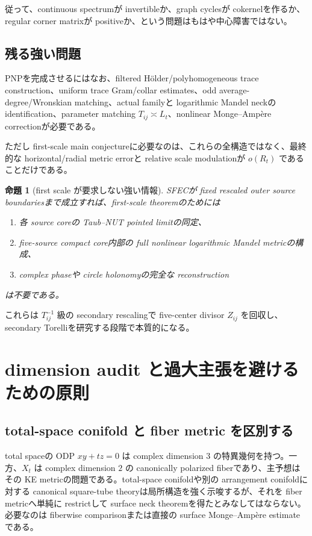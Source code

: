\documentclass[11pt,a4paper]{ltjsarticle}
\theoremstyle{plain}
\newtheorem{proposition}[conjecture]{命題}
\theoremstyle{definition}
\theoremstyle{remark}
\begin{document}
従って、continuous spectrumが invertibleか、graph cyclesが cokernelを作るか、regular corner matrixが positiveか、という問題はもはや中心障害ではない。

\subsection{残る強い問題}
PNPを完成させるにはなお、filtered Hölder/polyhomogeneous trace construction、uniform trace Gram/collar estimates、odd average-degree/Wronskian matching、actual familyと logarithmic Mandel neckの identification、parameter matching $T_{ij}\asymp L_t$、nonlinear Monge--Ampère correctionが必要である。

ただし first-scale main conjectureに必要なのは、これらの全構造ではなく、最終的な horizontal/radial metric errorと relative scale modulationが $o(R_t)$ であることだけである。

\begin{proposition}[first scale が要求しない強い情報]\label{prop:not-needed-v21}
SFECが fixed rescaled outer source boundariesまで成立すれば、first-scale theoremのためには
\begin{enumerate}[label=(\roman*)]
\item 各 source coreの Taub--NUT pointed limitの同定、
\item five-source compact core内部の full nonlinear logarithmic Mandel metricの構成、
\item complex phaseや circle holonomyの完全な reconstruction
\end{enumerate}
は不要である。
\end{proposition}

これらは $T_{ij}^{-1}$ 級の secondary rescalingで five-center divisor $Z_{ij}$ を回収し、secondary Torelliを研究する段階で本質的になる。

\section{dimension audit と過大主張を避けるための原則}\label{sec:audit-v21}

\subsection{total-space conifold と fiber metric を区別する}
total spaceの ODP $xy+tz=0$ は complex dimension $3$ の特異幾何を持つ。一方、$X_t$ は complex dimension $2$ の canonically polarized fiberであり、主予想はその KE metricの問題である。total-space conifoldや別の arrangement conifoldに対する canonical square-tube theoryは局所構造を強く示唆するが、それを fiber metricへ単純に restrictして surface neck theoremを得たとみなしてはならない。必要なのは fiberwise comparisonまたは直接の surface Monge--Ampère estimateである。
\end{document}
